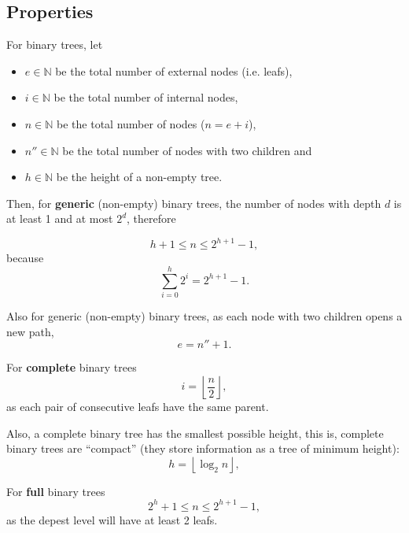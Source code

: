 \subsection{Properties}

For binary trees, let
\begin{itemize}

\item $e \in \mathbb{N}$ be the total number of external nodes (i.e. leafs),

\item $i \in \mathbb{N}$ be the total number of internal nodes,

\item $n \in \mathbb{N}$ be the total number of nodes ($n = e + i$),

\item $n'' \in \mathbb{N}$ be the total number of nodes with two children and

\item $h \in \mathbb{N}$ be the height of a non-empty tree.

\end{itemize}

\separator

Then, for \textbf{generic} (non-empty) binary trees, the number of nodes with
depth $d$ is at least 1 and at most $2^d$, therefore

\begin{equation}
  h + 1 \le n \le 2^{h+1} - 1,
\end{equation}
because
\begin{equation}
  \sum_{i=0}^{h}2^i = 2^{h+1} - 1.
\end{equation}

Also for generic (non-empty) binary trees, as each node with two children opens
a new path, \begin{equation} e = n'' + 1.  \end{equation}

\separator

For \textbf{complete} binary trees
\begin{equation}
  i = \left \lfloor{\frac{n}{2}}\right \rfloor,
\end{equation}
as each pair of consecutive leafs have the same parent.

Also, a complete binary tree has the smallest possible height,
this is, complete binary trees are ``compact''
(they store information as a tree of minimum height):
\begin{equation}
  h = \left \lfloor{\log_2 n}\right \rfloor,
\end{equation}

\separator

For \textbf{full} binary trees
\begin{equation}
  2^h + 1 \le n \le 2^{h+1} - 1,
\end{equation}
as the depest level will have at least 2 leafs.

